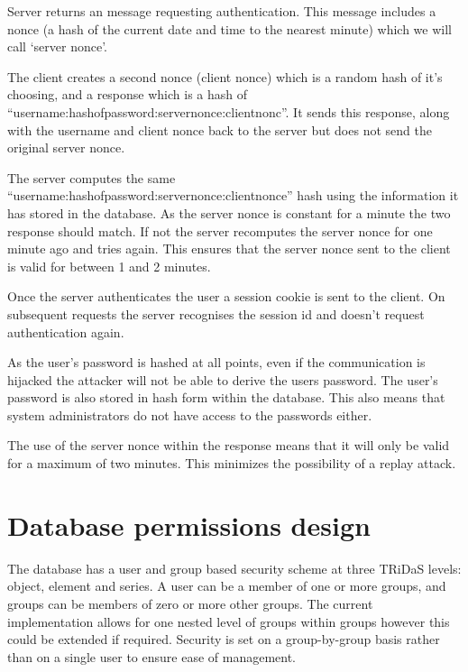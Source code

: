 \begin{itemize*}
 \item Server returns an message requesting authentication. This message includes a nonce (a hash of the current date and time to the nearest minute) which we will call `server nonce'.
 \item The client creates a second nonce (client nonce) which is a random hash of it's choosing, and a response which is a hash of ``username:hashofpassword:servernonce:clientnonc''. It sends this response, along with the username and client nonce back to the server but does not send the original server nonce.
 \item The server computes the same ``username:hashofpassword:servernonce:clientnonce'' hash using the information it has stored in the database. As the server nonce is constant for a minute the two response should match. If not the server recomputes the server nonce for one minute ago and tries again. This ensures that the server nonce sent to the client is valid for between 1 and 2 minutes.
 \item Once the server authenticates the user a session cookie is sent to the client. On subsequent requests the server recognises the session id and doesn't request authentication again. 
\end{itemize*}

As the user's password is hashed at all points, even if the communication is hijacked the attacker will not be able to derive the users password. The user's password is also stored in hash form within the database. This also means that system administrators do not have access to the passwords either.

The use of the server nonce within the response means that it will only be valid for a maximum of two minutes. This minimizes the possibility of a replay attack. 


\section{Database permissions design}
The database has a user and group based security scheme at three TRiDaS levels: object, element and series. A user can be a member of one or more groups, and groups can be members of zero or more other groups. The current implementation allows for one nested level of groups within groups however this could be extended if required. Security is set on a group-by-group basis rather than on a single user to ensure ease of management.

